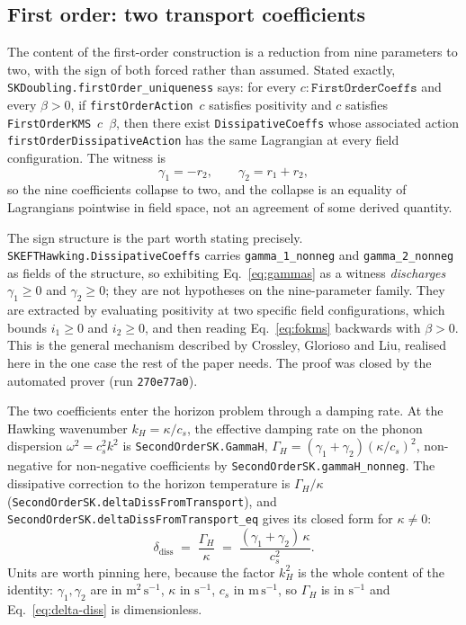 \documentclass[aps,prd,reprint,nofootinbib,superscriptaddress]{revtex4-2}
\begin{document}
\subsection{First order: two transport coefficients}
\label{sec:eft-first}

The content of the first-order construction is a reduction from nine
parameters to two, with the sign of both forced rather than assumed.
Stated exactly, \texttt{SKDoubling.firstOrder\_uniqueness} says: for
every $c : \texttt{FirstOrderCoeffs}$ and every $\beta > 0$, if
\texttt{firstOrderAction}~$c$ satisfies positivity and $c$ satisfies
\texttt{FirstOrderKMS}~$c$~$\beta$, then there exist
\texttt{DissipativeCoeffs} whose associated action
\texttt{firstOrderDissipativeAction} has the same Lagrangian at every
field configuration. The witness is
\begin{equation}
\label{eq:gammas}
\gamma_1 = -r_2, \qquad \gamma_2 = r_1 + r_2 ,
\end{equation}
so the nine coefficients collapse to two, and the collapse is an equality
of Lagrangians pointwise in field space, not an agreement of some derived
quantity.

The sign structure is the part worth stating precisely.
\texttt{SKEFTHawking.DissipativeCoeffs} carries
\texttt{gamma\_1\_nonneg} and \texttt{gamma\_2\_nonneg} as fields of the
structure, so exhibiting Eq.~\eqref{eq:gammas} as a witness
\emph{discharges} $\gamma_1 \geq 0$ and $\gamma_2 \geq 0$; they are not
hypotheses on the nine-parameter family. They are extracted by evaluating
positivity at two specific field configurations, which bounds
$i_1 \geq 0$ and $i_2 \geq 0$, and then reading Eq.~\eqref{eq:fokms}
backwards with $\beta > 0$. This is the general mechanism described by
Crossley, Glorioso and Liu, realised here in the one case the rest of the
paper needs. The proof was closed by the automated prover (run
\texttt{270e77a0}).

The two coefficients enter the horizon problem through a damping rate. At
the Hawking wavenumber $k_H = \kappa/c_s$, the effective damping rate on
the phonon dispersion $\omega^{2} = c_s^{2}k^{2}$ is
\texttt{SecondOrderSK.GammaH},
$\Gamma_H = (\gamma_1+\gamma_2)(\kappa/c_s)^{2}$, non-negative for
non-negative coefficients by \texttt{SecondOrderSK.gammaH\_nonneg}. The
dissipative correction to the horizon temperature is $\Gamma_H/\kappa$
(\texttt{SecondOrderSK.deltaDissFromTransport}), and
\texttt{SecondOrderSK.deltaDissFromTransport\_eq} gives its closed form
for $\kappa \neq 0$:
\begin{equation}
\label{eq:delta-diss}
\delta_{\mathrm{diss}} \;=\; \frac{\Gamma_H}{\kappa}
\;=\; \frac{(\gamma_1+\gamma_2)\,\kappa}{c_s^{2}} .
\end{equation}
Units are worth pinning here, because the factor $k_H^{2}$ is the whole
content of the identity: $\gamma_1,\gamma_2$ are in
$\mathrm{m^{2}\,s^{-1}}$, $\kappa$ in $\mathrm{s^{-1}}$, $c_s$ in
$\mathrm{m\,s^{-1}}$, so $\Gamma_H$ is in $\mathrm{s^{-1}}$ and
Eq.~\eqref{eq:delta-diss} is dimensionless.
\end{document}
